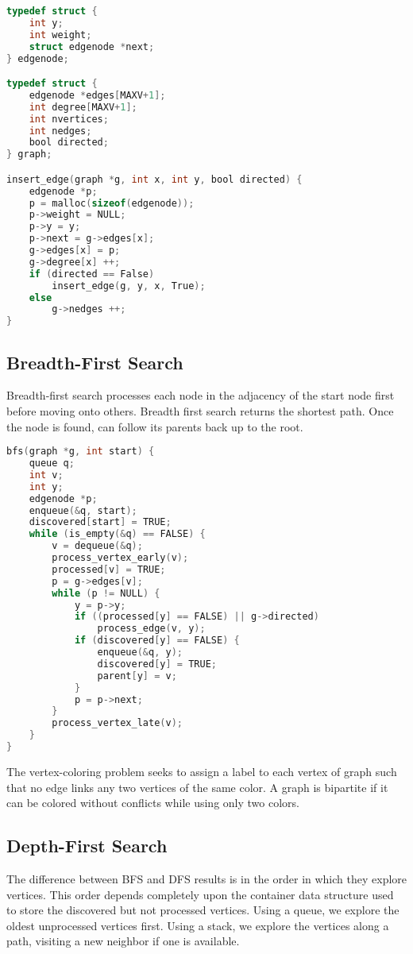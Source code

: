 \documentclass[10pt]{article}
\theoremstyle{definition}
\begin{document}
\begin{lstlisting}[language=C]
typedef struct {
    int y;
    int weight;
    struct edgenode *next;
} edgenode;

typedef struct {
    edgenode *edges[MAXV+1];
    int degree[MAXV+1];
    int nvertices;
    int nedges;
    bool directed;
} graph;

insert_edge(graph *g, int x, int y, bool directed) {
    edgenode *p;
    p = malloc(sizeof(edgenode));
    p->weight = NULL;
    p->y = y;
    p->next = g->edges[x];
    g->edges[x] = p;
    g->degree[x] ++;
    if (directed == False)
        insert_edge(g, y, x, True);
    else
        g->nedges ++;
}
\end{lstlisting}

\subsection{Breadth-First Search}
Breadth-first search processes each node in the adjacency of the start node first before moving onto others. Breadth first search returns the shortest path. Once the node is found, can follow its parents back up to the root.
\begin{lstlisting}[language=C]
bfs(graph *g, int start) {
    queue q;
    int v;
    int y;
    edgenode *p;
    enqueue(&q, start);
    discovered[start] = TRUE;
    while (is_empty(&q) == FALSE) {
        v = dequeue(&q);
        process_vertex_early(v);
        processed[v] = TRUE;
        p = g->edges[v];
        while (p != NULL) {
            y = p->y;
            if ((processed[y] == FALSE) || g->directed)
                process_edge(v, y);
            if (discovered[y] == FALSE) {
                enqueue(&q, y);
                discovered[y] = TRUE;
                parent[y] = v;
            }
            p = p->next;
        }
        process_vertex_late(v);
    }
}
\end{lstlisting}
The vertex-coloring problem seeks to assign a label to each vertex of graph such that no edge links any two vertices of the same color. A graph is bipartite if it can be colored without conflicts while using only two colors.

\subsection{Depth-First Search}
The difference between BFS and DFS results is in the order in which they explore vertices. This order depends completely upon the container data structure used to store the discovered but not processed vertices. Using a queue, we explore the oldest unprocessed vertices first. Using a stack, we explore the vertices along a path, visiting a new neighbor if one is available.
\end{document}

